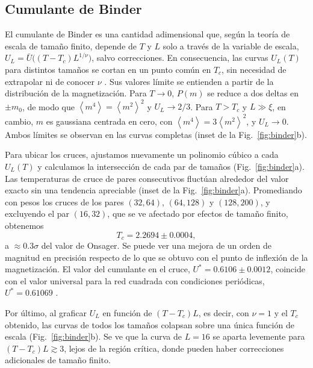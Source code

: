 \documentclass[a4paper,11pt]{article}
\newcommand{\expval}[1]{\left\langle #1 \right\rangle}
\newcommand{\Tc}{T_c}
\begin{document}
\subsection{Cumulante de Binder}
\label{sec:binder}
El cumulante de Binder es una cantidad adimensional que, según la teoría de escala de tamaño finito, depende de $T$ y $L$ solo a través de la variable de escala, $U_L = \bar U\big((T - \Tc) L^{1/\nu}\big)$, salvo correcciones.
En consecuencia, las curvas $U_L(T)$ para distintos tamaños se cortan en un punto común en $\Tc$, sin necesidad de extrapolar ni de conocer $\nu$ \cite{landauGuideMonteCarlo2020}.
Sus valores límite se entienden a partir de la distribución de la magnetización.
Para $T \to 0$, $P(m)$ se reduce a dos deltas en $\pm m_0$, de modo que $\expval{m^4} = \expval{m^2}^2$ y $U_L \to 2/3$.
Para $T > \Tc$ y $L \gg \xi$, en cambio, $m$ es gaussiana centrada en cero, con $\expval{m^4} = 3\expval{m^2}^2$, y $U_L \to 0$.
Ambos límites se observan en las curvas completas (inset de la Fig.~\ref{fig:binder}b).

Para ubicar los cruces, ajustamos nuevamente un polinomio cúbico a cada $U_L(T)$  y calculamos la intersección de cada par de tamaños (Fig.~\ref{fig:binder}a).
Las temperaturas de cruce de pares consecutivos fluctúan alrededor del valor exacto sin una tendencia apreciable (inset de la Fig.~\ref{fig:binder}a).
Promediando con pesos los cruces de los pares $(32, 64)$, $(64, 128)$ y $(128, 200)$, y excluyendo el par $(16, 32)$, que se ve afectado por efectos de tamaño finito, obtenemos
\begin{equation}
  \Tc = 2.2694 \pm 0.0004,
\end{equation}
a $\approx 0.3\sigma$ del valor de Onsager.
Se puede ver una mejora de un orden de magnitud en precisión respecto de lo que se obtuvo con el punto de inflexión de la magnetización.
El valor del cumulante en el cruce, $U^* = 0.6106 \pm 0.0012$, coincide con el valor universal para la red cuadrada con condiciones periódicas, $U^* = 0.61069$ \cite{kamieniarzUniversalRatioMagnetization1993}.

Por último, al graficar $U_L$ en función de $(T - \Tc) L$, es decir, con $\nu = 1$ y el $\Tc$ obtenido, las curvas de todos los tamaños colapsan sobre una única función de escala (Fig.~\ref{fig:binder}b).
Se ve que la curva de $L = 16$ se aparta levemente para $(T - \Tc) L \gtrsim 3$, lejos de la región crítica, donde pueden haber correcciones adicionales de tamaño finito.
\end{document}
